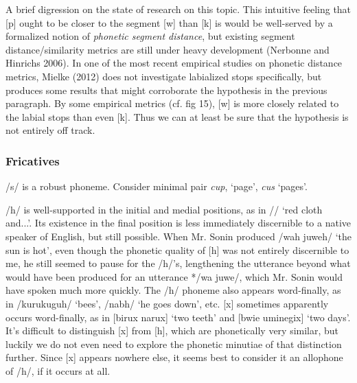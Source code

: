 \documentclass[pdftex,12pt,letterpaper]{article}
\let\ipa\textipa
\def\sw{\ipa{\super w}}
\begin{document}
 A brief digression on the state of research on this topic. This intuitive feeling that [p] ought to be closer to the segment [w] than [k] is would be well-served by a formalized notion of \emph{phonetic segment distance}, but existing segment distance/similarity metrics are still under heavy development (Nerbonne and Hinrichs 2006). In one of the most recent empirical studies on phonetic distance metrics, Mielke (2012) does not investigate labialized stops specifically, but produces some results that might corroborate the hypothesis in the previous paragraph. By some empirical metrics (cf. fig 15), [w] is more closely related to the labial stops than even [k\sw]. Thus we can at least be sure that the hypothesis is not entirely off track.

 \subsubsection{Fricatives}

 /s/ is a robust phoneme. Consider minimal pair \emph{cup}, `page', \emph{cus} `pages'. 

 /h/ is well-supported in the initial and medial positions, as in /\ipa{ah{\sw}i aropa hani}/ `red cloth and...'. Its existence in the final position is less immediately discernible to a native speaker of English, but still possible. When Mr. Sonin produced /wah juweh/ `the sun is hot', even though the phonetic quality of [h] was not entirely discernible to me, he still seemed to pause for the /h/'s, lengthening the utterance beyond what would have been produced for an utterance */wa juwe/, which Mr. Sonin would have spoken much more quickly. The /h/ phoneme also appears word-finally, as in /kurukuguh/ `bees', /nab\ipa{1}h/ `he goes down', etc. [x] sometimes apparently occurs word-finally, as in [bi\ipa{@}rux narux] `two teeth' and [bwie \ipa{\textltailn}umineg\sw ix] `two days'. It's difficult to distinguish [x] from [h], which are phonetically very similar, but luckily we do not even need to explore the phonetic minutiae of that distinction further. Since [x] appears nowhere else, it seems best to consider it an allophone of /h/, if it occurs at all.
 
\end{document}
